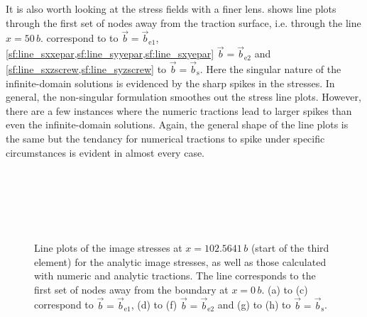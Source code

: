 \documentclass[11pt]{iopart}
\begin{document}
It is also worth looking at the stress fields with a finer lens.  shows line plots through the first set of nodes away from the traction surface, i.e. through the line $x = 50\, b$.  correspond to to $\vec{b} = \vec{b}_{\textrm{e1}}$, \cref{sf:line_sxxepar,sf:line_syyepar,sf:line_sxyepar} $\vec{b} = \vec{b}_{\textrm{e2}}$ and \cref{sf:line_sxzscrew,sf:line_syzscrew} to $\vec{b} = \vec{b}_{\textrm{s}}$. Here the singular nature of the infinite-domain solutions is evidenced by the sharp spikes in the stresses. In general, the non-singular formulation smoothes out the stress line plots. However, there are a few instances where the numeric tractions lead to larger spikes than even the infinite-domain solutions. Again, the general shape of the line plots is the same but the tendancy for numerical tractions to spike under specific circumstances is evident in almost every case.
\begin{figure}
    \centering
    ~
    ~

    ~
    ~

    ~
    \caption{Line plots of the image stresses at $x = 102.5641\, b$ (start of the third element) for the analytic image stresses, as well as those calculated with numeric and analytic tractions. The line corresponds to the first set of nodes away from the boundary at $x = 0\, b$. (a) to (c) correspond to $\vec{b} = \vec{b}_{\textrm{e1}}$, (d) to (f) $\vec{b} = \vec{b}_{\textrm{e2}}$ and (g) to (h) to $\vec{b} = \vec{b}_{\textrm{s}}$.}
    \label{f:line_head_vs_ana_vs_num}
\end{figure}
\end{document}
